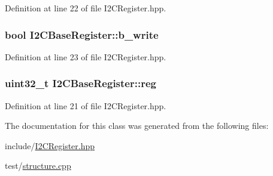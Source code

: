 Definition at line 22 of file I2\+C\+Register.\+hpp.

\subsubsection[{\texorpdfstring{b\+\_\+write}{b_write}}]{\setlength{\rightskip}{0pt plus 5cm}bool I2\+C\+Base\+Register\+::b\+\_\+write\hspace{0.3cm}{\ttfamily [protected]}}\hypertarget{class_i2_c_base_register_ae0691af94ba363130da18520310a8c09}{}\label{class_i2_c_base_register_ae0691af94ba363130da18520310a8c09}


Definition at line 23 of file I2\+C\+Register.\+hpp.

\subsubsection[{\texorpdfstring{reg}{reg}}]{\setlength{\rightskip}{0pt plus 5cm}uint32\+\_\+t I2\+C\+Base\+Register\+::reg\hspace{0.3cm}{\ttfamily [protected]}}\hypertarget{class_i2_c_base_register_a5ec30e59be3ce0626848c665dbea8047}{}\label{class_i2_c_base_register_a5ec30e59be3ce0626848c665dbea8047}


Definition at line 21 of file I2\+C\+Register.\+hpp.



The documentation for this class was generated from the following files\+:\begin{DoxyCompactItemize}
\item 
include/\hyperlink{_i2_c_register_8hpp}{I2\+C\+Register.\+hpp}\item 
test/\hyperlink{structure_8cpp}{structure.\+cpp}\end{DoxyCompactItemize}
